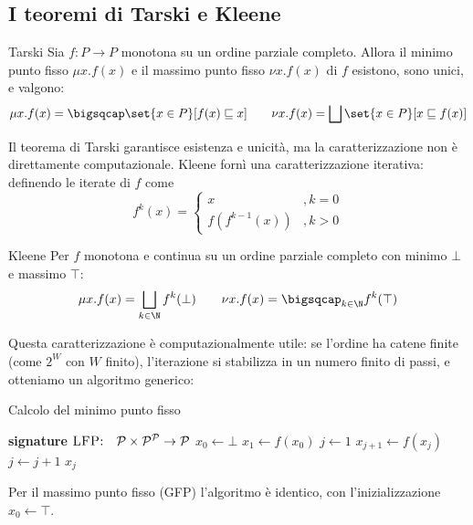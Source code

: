 \subsection{I teoremi di Tarski e Kleene}

\begin{theorem}{Tarski}
  Sia \(f: P \to P\) monotona su un ordine parziale completo. Allora il minimo punto fisso \(\mu x . f(x)\) e il massimo punto fisso \(\nu x . f(x)\) di \(f\) esistono, sono unici, e valgono:
  \[\mu x . f(x) = \bigsqcap \set{x\in P}[f(x) \sqsubseteq x] \qquad \nu x . f(x) = \bigsqcup \set{x\in P}[x \sqsubseteq f(x)]\]
\end{theorem}

Il teorema di Tarski garantisce esistenza e unicità, ma la caratterizzazione non è direttamente computazionale. Kleene fornì una caratterizzazione iterativa: definendo le iterate di \(f\) come
\[f^k(x) = \begin{cases}
    x             & ,k = 0 \\
    f(f^{k-1}(x)) & ,k > 0
  \end{cases}\]

\begin{theorem}{Kleene}
  Per \(f\) monotona e continua su un ordine parziale completo con minimo \(\bot\) e massimo \(\top\):
  \[\mu x . f(x) = \bigsqcup_{k\in\N} f^k(\bot) \qquad \nu x . f(x) = \bigsqcap_{k\in\N} f^k(\top)\]
\end{theorem}

Questa caratterizzazione è computazionalmente utile: se l'ordine ha catene finite (come \(2^W\) con \(W\) finito), l'iterazione si stabilizza in un numero finito di passi, e otteniamo un algoritmo generico:

\begin{algorithmdesc}{Calcolo del minimo punto fisso}
  \begin{algorithmic}[1]
    \Statex{} \textbf{signature} \(\textsc{LFP:} \quad \mathcal{P} \times \mathcal{P}^{\mathcal{P}} \to \mathcal{P} \)
    \State{} \(x_0 \gets \bot\)
    \State{} \(x_1 \gets f(x_0)\)
    \State{} \(j \gets 1\)
    \State{} \(x_{j+1} \gets f(x_j)\) 
    \State{} \(j \gets j + 1\)
    \EndWhile{}
    \State{} \Return{} \(x_j\)
    \EndFunction{}
  \end{algorithmic}
\end{algorithmdesc}

Per il massimo punto fisso (\textsc{GFP}) l'algoritmo è identico, con l'inizializzazione \(x_0 \gets \top\).


